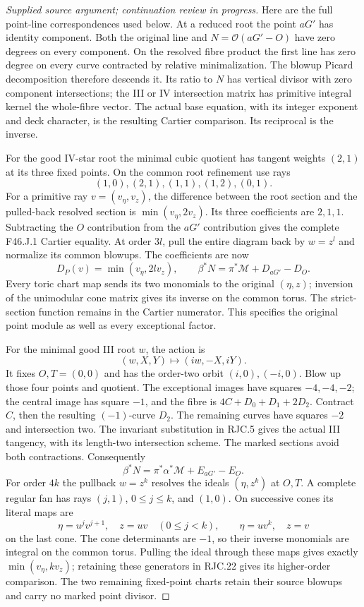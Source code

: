 \begin{proof}[Supplied source argument; continuation review in progress]
Here are the full point-line correspondences used below. At a reduced
root the point \(aG'\) has identity component. Both the original line
and \(N=\mathcal O(aG'-O)\) have zero degrees on every component. On
the resolved fibre product the first line has zero degree on every
curve contracted by relative minimalization. The blowup Picard
decomposition therefore descends it. Its ratio to \(N\) has vertical
divisor with zero component intersections; the III or IV intersection
matrix has primitive integral kernel the whole-fibre vector. The
actual base equation, with its integer exponent and deck character,
is the resulting Cartier comparison. Its reciprocal is the inverse.

For the good IV-star root the minimal cubic quotient has tangent
weights \((2,1)\) at its three fixed points. On the common root
refinement use rays
\[
 (1,0),(2,1),(1,1),(1,2),(0,1).
 \tag{RJC.19}
\]
For a primitive ray \(v=(v_\eta,v_z)\), the difference between the
root section and the pulled-back resolved section is
\(\min(v_\eta,2v_z)\). Its three coefficients are \(2,1,1\).
Subtracting the \(O\) contribution from the \(aG'\) contribution
gives the complete F46.J.1 Cartier equality. At order \(3l\), pull
the entire diagram back by \(w=z^l\) and normalize its common
blowups. The coefficients are now
\[
 D_P(v)=\min(v_\eta,2l v_z),\qquad
 \beta^*N=\pi^*\mathcal M+D_{aG'}-D_O.
 \tag{RJC.20}
\]
Every toric chart map sends its two monomials to the original
\((\eta,z)\); inversion of the unimodular cone matrix gives its
inverse on the common torus. The strict-section function remains
in the Cartier numerator. This specifies the original point module
as well as every exceptional factor.

For the minimal good III root \(w\), the action is
\[
 (w,X,Y)\longmapsto(iw,-X,iY).
 \tag{RJC.21}
\]
It fixes \(O,T=(0,0)\) and has the order-two orbit
\((i,0),(-i,0)\). Blow up those four points and quotient. The
exceptional images have squares \(-4,-4,-2\); the central image
has square \(-1\), and the fibre is \(4C+D_0+D_1+2D_2\).
Contract \(C\), then the resulting \((-1)\)-curve \(D_2\).
The remaining curves have squares \(-2\) and intersection two.
The invariant substitution in RJC.5 gives the actual III
tangency, with its length-two intersection scheme. The marked
sections avoid both contractions. Consequently
\[
 \beta^*N=\pi^*\alpha^*\mathcal M+E_{aG'}-E_O.
 \tag{RJC.22}
\]
For order \(4k\) the pullback \(w=z^k\) resolves the ideals
\((\eta,z^k)\) at \(O,T\). A complete regular fan has rays
\((j,1)\), \(0\le j\le k\), and \((1,0)\). On successive cones its
literal maps are
\[
 \eta=u^jv^{j+1},\quad z=uv\quad(0\le j<k),\qquad
 \eta=uv^k,\quad z=v
 \tag{RJC.23}
\]
on the last cone. The cone determinants are \(-1\), so their inverse
monomials are integral on the common torus. Pulling the ideal through
these maps gives exactly \(\min(v_\eta,k v_z)\); retaining these
generators in RJC.22 gives its higher-order comparison. The two
remaining fixed-point charts retain their source blowups and carry
no marked point divisor.


\end{proof}
